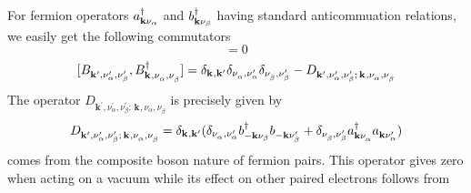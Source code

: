 \documentclass[11pt]{article} %
\begin{document}
For fermion operators $a^{\dagger}_{\mathbf{k}\nu_{\alpha}}$ and $b^{\dagger}_{\mathbf{k}\nu_{\beta}}$ having standard anticommuation relations, we easily get the following commutators
\begin{equation}
[B^{\dg}_{\mathbf{k}^{{\prime}},\nu_{\alpha}^{{\prime}},\nu_{\beta}^{{\prime}}},B^{\dg}_{\mathbf{k}^{ },\nu_{\alpha}^{},\nu_{\beta}^{}}]=0
\end{equation}
\begin{equation}\label{eq:bb}
[B^{}_{\mathbf{k}^{\prime },\nu_{\alpha}^{{\prime}},\nu_{\beta}^{{\prime}}},B^{\dagger}_{\mathbf{k}^{ },\nu_{\alpha}^{},\nu_{\beta}^{}}]=
	\delta_{\mathbf{k}^{ },\mathbf{k}^{{\prime}}}\delta_{\nu_{\alpha}^{},\nu_{\alpha}^{{\prime}}}\delta_{\nu_{\beta}^{},\nu_{\beta}^{{\prime}}}-
	D^{}_{\mathbf{k}^{{\prime} },\nu_{\alpha}^{{\prime}},\nu_{\beta}^{{\prime}};\,\mathbf{k}^{ },\nu_{\alpha}^{},\nu_{\beta}^{}}
\end{equation}
The operator $D^{}_{\mathbf{k}^{{\prime} },\nu_{\alpha}^{{\prime}},\nu_{\beta}^{{\prime}};\,\mathbf{k}^{ },\nu_{\alpha}^{},\nu_{\beta}^{}}$ is precisely given by
\begin{equation}
D^{}_{\mathbf{k}^{{\prime} },\nu_{\alpha}^{{\prime}},\nu_{\beta}^{{\prime}};\,\mathbf{k}^{ },\nu_{\alpha}^{},\nu_{\beta}^{}}=
	\delta_{\mathbf{k}^{ },\mathbf{k}^{{\prime}}}(\delta_{\nu_{\alpha}^{},\nu_{\alpha}^{{\prime}}}b^{\dagger}_{-\mathbf{k}\nu_{\beta}}b^{}_{-\mathbf{k}\nu_{\beta}^{{\prime}}}+\delta_{\nu_{\beta}^{},\nu_{\beta}^{{\prime}}}a^{\dagger}_{\mathbf{k}\nu_{\alpha}^{}}a^{}_{\mathbf{k}\nu_{\alpha}^{{\prime}}})
\end{equation}
comes from the composite boson nature of fermion pairs.  This operator gives zero when acting on a vacuum while its effect on other paired electrons follows from 
\end{document}
